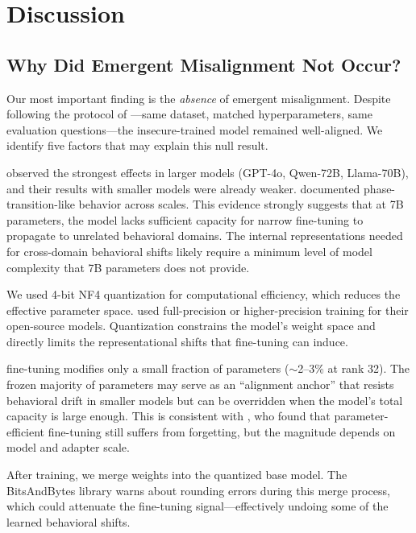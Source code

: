 \section{Discussion}
\label{sec:discussion}

\subsection{Why Did Emergent Misalignment Not Occur?}
\label{sec:why_null}

Our most important finding is the \emph{absence} of emergent misalignment.
Despite following the protocol of \citet{betley2025emergent}---same dataset, matched hyperparameters, same evaluation questions---the insecure-trained model remained well-aligned.
We identify five factors that may explain this null result.

\citet{betley2025emergent} observed the strongest \EM effects in larger models (GPT-4o, Qwen-72B, Llama-70B), and their results with smaller models were already weaker.
\citet{turner2025model} documented phase-transition-like behavior across scales.
This evidence strongly suggests that at 7B parameters, the model lacks sufficient capacity for narrow fine-tuning to propagate to unrelated behavioral domains.
The internal representations needed for cross-domain behavioral shifts likely require a minimum level of model complexity that 7B parameters does not provide.

We used 4-bit NF4 quantization for computational efficiency, which reduces the effective parameter space.
\citet{betley2025emergent} used full-precision or higher-precision training for their open-source models.
Quantization constrains the model's weight space and directly limits the representational shifts that fine-tuning can induce.

\lora fine-tuning modifies only a small fraction of parameters ($\sim$2--3\% at rank 32).
The frozen majority of parameters may serve as an ``alignment anchor'' that resists behavioral drift in smaller models but can be overridden when the model's total capacity is large enough.
This is consistent with \citet{scalinglaws2024forgetting}, who found that parameter-efficient fine-tuning still suffers from forgetting, but the magnitude depends on model and adapter scale.

After training, we merge \lora weights into the quantized base model.
The BitsAndBytes library warns about rounding errors during this merge process, which could attenuate the fine-tuning signal---effectively undoing some of the learned behavioral shifts.

